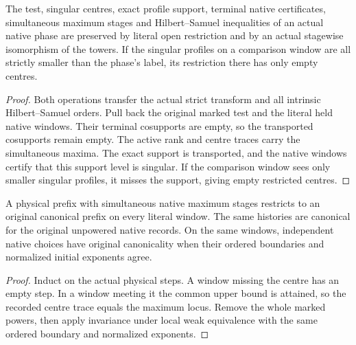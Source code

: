 \begin{theorem}
\label{hir:g8-native-phase-certificate}
The test, singular centres, exact profile support, terminal native
certificates, simultaneous maximum stages and Hilbert--Samuel inequalities of an actual native
phase are preserved by literal open restriction and by an actual
stagewise isomorphism of the towers. If the singular profiles on
a comparison window are all strictly smaller than the phase's label,
its restriction there has only empty centres.
\end{theorem}
\begin{proof}
Both operations transfer the actual strict transform and all intrinsic
Hilbert--Samuel orders. Pull back the original marked test and the
literal held native windows. Their terminal cosupports are empty,
so the transported cosupports remain empty. The active rank and centre
traces carry the simultaneous maxima. The exact support is
transported, and the native windows certify that this support level
is singular. If the comparison window sees only smaller singular
profiles, it misses the support, giving empty restricted centres.
\end{proof}

\begin{theorem}
\label{hir:g8-native-prefix-original-canonical}
\leanok
A physical prefix with simultaneous native maximum stages
restricts to an original canonical prefix on every literal
window. The same histories are canonical for the original
unpowered native records. On the same windows, independent
native choices have original canonicality when their ordered
boundaries and normalized initial exponents agree.
\end{theorem}
\begin{proof}
Induct on the actual physical steps. A window missing the
centre has an empty step. In a window meeting it the common
upper bound is attained, so the recorded centre trace equals
the maximum locus. Remove the whole marked powers, then
apply invariance under local weak equivalence with the same
ordered boundary and normalized exponents.
\end{proof}

